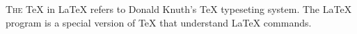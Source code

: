 \documentclass{article}
\begin{document}
\lettrine{T}{he} \TeX{} in \LaTeX{} refers 
to Donald Knuth's \TeX{} typeseting system.
The \LaTeX{} program is a special version of 
\TeX{} that understand \LaTeX{} commands.
\end{document}
